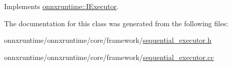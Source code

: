 Implements \mbox{\hyperlink{classonnxruntime_1_1IExecutor_a72794c9d86c407a835858c739ac4fb3e}{onnxruntime\+::\+I\+Executor}}.



The documentation for this class was generated from the following files\+:\begin{DoxyCompactItemize}
\item 
onnxruntime/onnxruntime/core/framework/\mbox{\hyperlink{sequential__executor_8h}{sequential\+\_\+executor.\+h}}\item 
onnxruntime/onnxruntime/core/framework/\mbox{\hyperlink{sequential__executor_8cc}{sequential\+\_\+executor.\+cc}}\end{DoxyCompactItemize}
